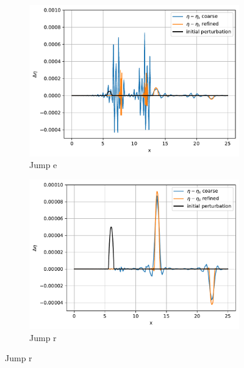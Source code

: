 \documentclass[pt12]{beamer}
\begin{document}
\begin{frame}
\begin{figure}
\begin{subfigure}[b]{0.28\textwidth}
         \includegraphics[width=\textwidth]{alb_sup_WBp3s14je.pdf}
         \caption{Jump e}
     \end{subfigure}
     \begin{subfigure}[b]{0.28\textwidth}
         \centering
         \includegraphics[width=\textwidth]{alb_sup_WBp3s14jr.pdf}
         \caption{Jump r}
     \end{subfigure}
        \label{pert_super_jumps}
\end{figure}
\end{frame}
\end{document}
